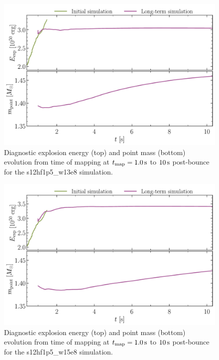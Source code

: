 \begin{figure}
    \centering
    \includegraphics[width=0.9\linewidth]{figures/s12hf1p5_weak_quantities.pdf}
    \caption{Diagnostic explosion energy (top) and point mass (bottom) evolution from time of mapping at \(t_\mathrm{map} = 1.0 \,\mathrm{s}\) to \(10\,\mathrm{s}\) post-bounce for the s12hf1p5\_w13e8 simulation.}
    \label{fig:s12hf1p5_weak_quantities}
\end{figure}

\begin{figure}
    \centering
    \includegraphics[width=0.9\linewidth]{figures/s12hf1p5_strong_quantities.pdf}
    \caption{Diagnostic explosion energy (top) and point mass (bottom) evolution from time of mapping at \(t_\mathrm{map} = 1.0 \,\mathrm{s}\) to \(10\,\mathrm{s}\) post-bounce for the s12hf1p5\_w15e8 simulation.}
    \label{fig:s12hf1p5_strong_quantities}
\end{figure}

\clearpage

